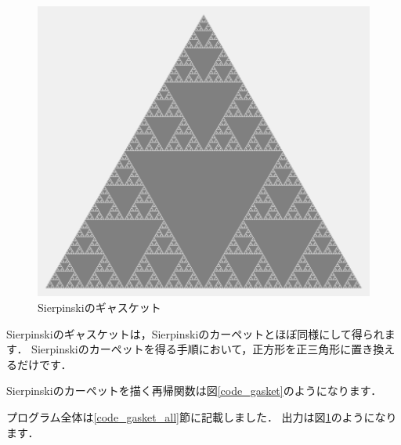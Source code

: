 \documentclass[dvipdfmx]{jsarticle}
\theoremstyle{definition}
\begin{document}
\begin{figure}
\begin{center}
    \includegraphics[scale=0.20]{figure/gasket.png}
\end{center}
\caption{Sierpinskiのギャスケット}
\label{pic_gasket}
\end{figure}

Sierpinskiのギャスケットは，Sierpinskiのカーペットとほぼ同様にして得られます．
Sierpinskiのカーペットを得る手順において，正方形を正三角形に置き換えるだけです．

Sierpinskiのカーペットを描く再帰関数は図\ref{code_gasket}のようになります．

プログラム全体は\ref{code_gasket_all}節に記載しました．
出力は図\ref{pic_gasket}のようになります．
\end{document}

